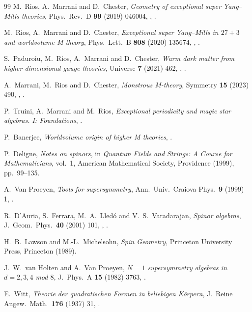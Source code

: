 \begin{thebibliography}{99}
M.~Rios, A.~Marrani and D.~Chester, \textit{Geometry of exceptional super Yang--Mills theories}, Phys.\ Rev.\ D \textbf{99} (2019) 046004, , .

M.~Rios, A.~Marrani and D.~Chester, \textit{Exceptional super Yang--Mills in $27+3$ and worldvolume M-theory}, Phys.\ Lett.\ B \textbf{808} (2020) 135674, , .

S.~Paduroiu, M.~Rios, A.~Marrani and D.~Chester, \textit{Warm dark matter from higher-dimensional gauge theories}, Universe \textbf{7} (2021) 462, , .

A.~Marrani, M.~Rios and D.~Chester, \textit{Monstrous M-theory}, Symmetry \textbf{15} (2023) 490, , .

P.~Truini, A.~Marrani and M.~Rios, \textit{Exceptional periodicity and magic star algebras. I: Foundations}, .

P.~Banerjee, \textit{Worldvolume origin of higher M theories}, .

P.~Deligne, \textit{Notes on spinors}, in \textit{Quantum Fields and Strings: A Course for Mathematicians}, vol.~1, American Mathematical Society, Providence (1999), pp.~99--135.

A.~Van Proeyen, \textit{Tools for supersymmetry}, Ann.\ Univ.\ Craiova Phys.\ \textbf{9} (1999) 1, .

R.~D'Auria, S.~Ferrara, M.~A.~Lled\'o and V.~S.~Varadarajan, \textit{Spinor algebras}, J.\ Geom.\ Phys.\ \textbf{40} (2001) 101, , .

H.~B.~Lawson and M.-L.~Michelsohn, \textit{Spin Geometry}, Princeton University Press, Princeton (1989).

J.~W.~van Holten and A.~Van Proeyen, \textit{$N=1$ supersymmetry algebras in $d=2,3,4$ mod $8$}, J.\ Phys.\ A \textbf{15} (1982) 3763, .

E.~Witt, \textit{Theorie der quadratischen Formen in beliebigen K\"orpern}, J.\ Reine Angew.\ Math.\ \textbf{176} (1937) 31, .


\end{thebibliography}

